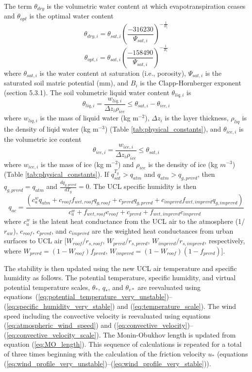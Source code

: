 \documentclass[12pt,authoryear]{elsarticle}
\numberwithin{equation}{section} %
\begin{document}
The term $\theta_{dry}$ is the volumetric water content at which evapotranspiration ceases and $\theta_{opt}$ is the optimal water content
\begin{equation}
\theta_{dry,i}=\theta_{sat,i}\left(\frac{-316230}{\Psi_{sat,i}}\right)^{-\frac{1}{B_{i}}}   
\end{equation}
\begin{equation}
\theta_{opt,i}=\theta_{sat,i}\left(\frac{-158490}{\Psi_{sat,i}}\right)^{-\frac{1}{B_{i}}}
\end{equation}
where $\theta_{sat,i}$ is the water content at saturation (i.e., porosity), $\Psi_{sat,i}$ is the saturated soil matric potential (mm), and $B_{i}$ is the Clapp-Hornberger exponent (section 5.3.1). The soil
volumetric liquid water content $\theta_{liq,i}$ is
\begin{equation}
\theta_{liq,i} = \frac{w_{liq,i}}{\Delta z_{i}\rho_{ice}} \leq \theta_{sat,i}-\theta_{ice,i}
\end{equation}
where $w_{liq,i}$ is the mass of liquid water (kg m$^{-2}$), $\Delta z_{i}$ is the layer thickness, $\rho_{liq}$ is the density of liqid water (kg m$^{-3}$) (Table \ref{tab:physical_constants}), and $\theta_{ice,i}$ is the volumetric ice content
\begin{equation}
\theta_{ice,i}=\frac{w_{ice,i}}{\Delta z_{i}\rho_{ice}}\leq\theta_{sat,i}
\end{equation}
where $w_{ice,i}$ is the mass of ice (kg m$^{-2}$) and $\rho_{ice}$ is the density of ice (kg $m^{-3}$) (Table \ref{tab:physical_constants}). If $q_{sat}^{T_{g}}>q_{atm}$ and $q_{atm}>q_{g,prvrd}$, then $q_{g,prvrd}=q_{atm}$ and $\frac{d q_{g,prvrd}}{d T_{g}}=0$.
The UCL specific humidity is then 
\begin{equation}
q_{ac}=\frac{\left(c_{a}^{w}q_{atm}+c_{roof}f_{wet,roof}q_{g,roof}+c_{prvrd}q_{g,prvrd}+c_{imprvrd}f_{wet,imprvrd}q_{g,imprvrd}\right)}{c_{a}^{w}+f_{wet,roof}c_{roof}+c_{prvrd}+f_{wet,imprvrd}c_{imprvrd}}
\end{equation}
where $c_{a}^w$ is the latent heat conductance from the UCL air to the atmosphere (1/$r_{aw}$), $c_{roof}$, $c_{prvrd}$, and $c_{imprvrd}$ are the weighted heat conductances from urban surfaces to UCL air [$W_{roof}/r_{s,roof}$, $W_{prvrd}/r_{s,prvrd}$, $W_{imprvrd}/r_{s,imprvrd}$, respectively, where $W_{prvrd}=(1-W_{roof})f_{prvrd}$, $W_{imprvrd}=(1-W_{roof})(1-f_{prvrd})$].

The stability is then updated using the new UCL air temperature and specific humidity as follows. The potential temperature, specific humidity, and virtual potential temperature scales, $\theta_{*}$, $q_{*}$, and $\theta_{v*}$ are reevaluated using equations~(\ref{eq:potential_temperature_very_unstable})--(\ref{eq:specific_humidity_very_stable}) and (\ref{eq:temperature_scale}). The wind speed including the convective velocity is reevaluated using equations (\ref{eq:atmospheric_wind_speed}) and (\ref{eq:convective_velocity})--(\ref{eq:convective_velocity_scale}). The Monin-Obukhov length is updated from equation (\ref{eq:MO_length}). This sequence of calculations is repeated for a total of three times beginning with the calculation of the friction velocity $u_*$ (equations (\ref{eq:wind_profile_very_unstable})--(\ref{eq:wind_profile_very_stable})). 
\end{document}
